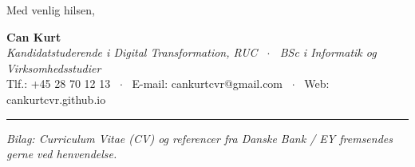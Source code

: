 \documentclass[10pt,a4paper]{article}
\begin{document}
\vspace{12pt}

Med venlig hilsen,

\vspace{14pt}

\textbf{\fontsize{11}{14}\selectfont Can Kurt} \\
{\fontsize{8.5}{11}\selectfont \textit{\color{mutedgray}Kandidatstuderende i Digital Transformation, RUC \ $\cdot$ \ BSc i Informatik og Virksomhedsstudier}} \\
{\fontsize{8}{10}\selectfont \color{mutedgray}Tlf.: +45 28 70 12 13 \ $\cdot$ \ E-mail: cankurtcvr@gmail.com \ $\cdot$ \ Web: cankurtcvr.github.io}

\vfill

{\color{bordergray}\rule{\linewidth}{0.5pt}}\vspace{3pt}
{\fontsize{7.5}{9.5}\selectfont \color{mutedgray}\textit{Bilag: Curriculum Vitae (CV) og referencer fra Danske Bank / EY fremsendes gerne ved henvendelse.}}
\end{document}
